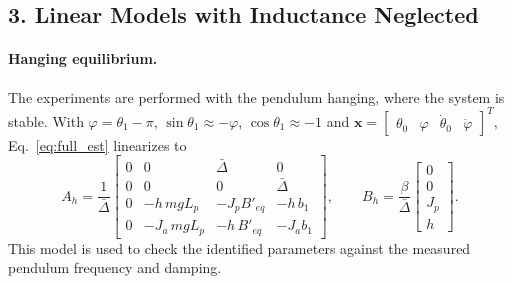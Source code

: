 \documentclass[a4paper,11pt]{article}
\begin{document}
\subsection{3. Linear Models with Inductance Neglected}
\paragraph{Hanging equilibrium.} The experiments are performed with the pendulum hanging, where the system is stable. With $\varphi = \theta_1 - \pi$, $\sin\theta_1 \approx -\varphi$, $\cos\theta_1 \approx -1$ and $\mathbf{x} = \begin{bmatrix} \theta_0 & \varphi & \dot\theta_0 & \dot\varphi \end{bmatrix}^T$, Eq.~\eqref{eq:full_est} linearizes to
\begin{equation}
  A_h = \frac{1}{\bar\Delta}\begin{bmatrix}
  0 & 0 & \bar\Delta & 0\\
  0 & 0 & 0 & \bar\Delta\\
  0 & -h\, m g L_p & -J_p B'_{eq} & -h\, b_1\\
  0 & -J_a\, m g L_p & -h\, B'_{eq} & -J_a b_1
  \end{bmatrix},
  \qquad
  B_h = \frac{\beta}{\bar\Delta}\begin{bmatrix} 0 \\ 0 \\ J_p \\ h \end{bmatrix}.
  \label{eq:ss_hang}
\end{equation}
This model is used to check the identified parameters against the measured pendulum frequency and damping.
\end{document}
